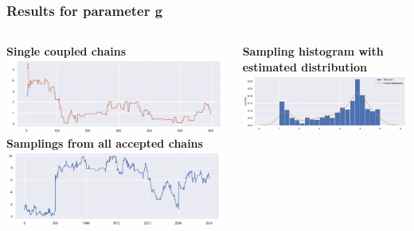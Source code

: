 \documentclass{beamer}
\begin{document}
\begin{frame}
	\frametitle{Results for parameter g}
	
	
	\begin{columns}
		
		\hspace{-5mm}
		\begin{column}{0.49\textwidth}
			\centering
			{\scriptsize \textbf{Single coupled chains}}\\
			\vspace{1.5mm}
			\includegraphics[width=0.85\columnwidth]{gk_all_pack/gk_all_chain_meeeting_2}
			\vspace{0.2cm}
			{	\scriptsize \textbf{Samplings from all accepted chains }}\\
			\includegraphics[width=\columnwidth]{gk_all_pack/gk_all_sampling_2}
		\end{column}
		\hspace{-13mm}
		\begin{column}{0.49\textwidth}
			\centering
			{\scriptsize \textbf{Sampling histogram with estimated distribution}}\\
			\vspace{3mm}
			\includegraphics[width=1.15\columnwidth]{gk_all_pack/gk_all_histogram_kernel_2}
		\end{column}
	\end{columns}
	

\end{frame}
\end{document}
